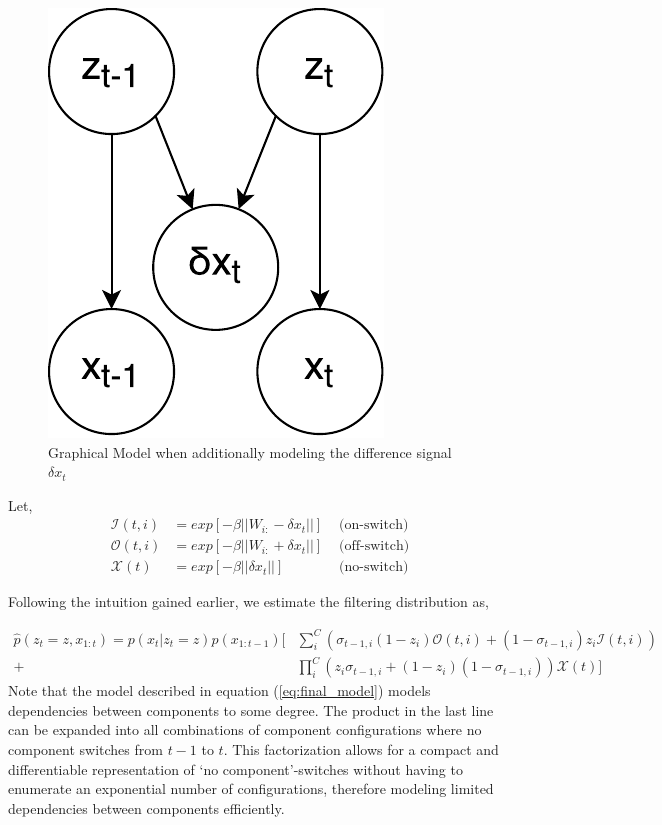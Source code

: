 \begin{figure}
\centering
\includegraphics[width=0.35\linewidth]{varbolt/gmod.pdf}
\caption[VarBOLT: Graphical Model when additionally modeling the difference signal.]{\label{graph_mod} Graphical Model when additionally modeling the difference signal $\delta x_t$}
\end{figure}
Let,
\begin{align*}
\mathcal{I}(t,i) &= exp[-\beta||W_{i:} - \delta x_t||] & \text{\ \ \ \ \ \ (on-switch)}\\
\mathcal{O}(t,i) &= exp[-\beta||W_{i:} + \delta x_t||]&\text{\ \ \ \ \ \ (off-switch)}\\
\mathcal{X}(t) &= exp[-\beta||\delta x_t||]& \text{\ \ \ \ \ \ (no-switch)}
\end{align*}

Following the intuition gained earlier, we estimate the filtering distribution as,

\begin{equation}
\begin{aligned}
\hat{p}(z_t = z, x_{1:t}) = p(x_t|z_t = z)p(x_{1:t-1})
[&\sum_i^C (\sigma_{t-1,i}(1-z_i)\mathcal{O}(t,i) + (1-\sigma_{t-1,i})z_i \mathcal{I}(t,i)) \\
+ &\prod_i^C(z_i\sigma_{t-1,i} + (1-z_i)(1-\sigma_{t-1,i})) \mathcal{X}(t)] \label{eq:final_model}
\end{aligned}
\end{equation}%
Note that the model described in equation (\ref{eq:final_model}) models dependencies between components to some degree. The product in the last line can be expanded into all combinations of component configurations where no component switches from $t-1$ to $t$. This factorization allows for a compact and differentiable representation of `no component'-switches without having to enumerate an exponential number of configurations, therefore modeling limited dependencies between components efficiently.

